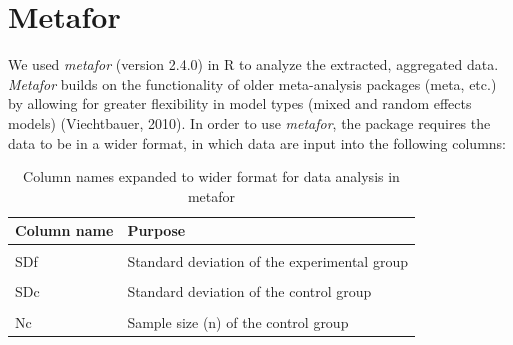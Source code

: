 \documentclass[12pt,twoside]{reedthesis}
\begin{document}
\hypertarget{metafor}{%
\section{Metafor}\label{metafor}}

We used \emph{metafor} (version 2.4.0) in R to analyze the extracted, aggregated data. \emph{Metafor} builds on the functionality of older meta-analysis packages (meta, etc.) by allowing for greater flexibility in model types (mixed and random effects models) (Viechtbauer, 2010). In order to use \emph{metafor}, the package requires the data to be in a wider format, in which data are input into the following columns:
\begin{table}[!h]

\caption{\label{tab:unnamed-chunk-10}Column names expanded to wider format for data analysis in metafor}
\centering
\begin{tabular}[t]{ll}
\toprule
\textbf{Column name} & \textbf{Purpose}\\
\midrule
\cellcolor{gray!6}{Mf} & \cellcolor{gray!6}{Mean of experimental group}\\
SDf & Standard deviation of the experimental group\\
\cellcolor{gray!6}{Mc} & \cellcolor{gray!6}{Mean of the control group}\\
SDc & Standard deviation of the control group\\
\cellcolor{gray!6}{Nf} & \cellcolor{gray!6}{Sample size (n) of the experimental group}\\
\addlinespace
Nc & Sample size (n) of the control group\\
\bottomrule
\end{tabular}
\end{table}
\linebreak
\end{document}
